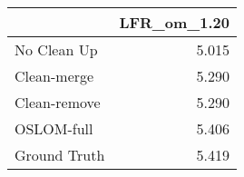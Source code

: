 \begin{tabular}{lr}
\toprule
{} & LFR_om_1.20 \\
\midrule
No Clean Up  &       5.015 \\
Clean-merge  &       5.290 \\
Clean-remove &       5.290 \\
OSLOM-full   &       5.406 \\
Ground Truth &       5.419 \\
\bottomrule
\end{tabular}
